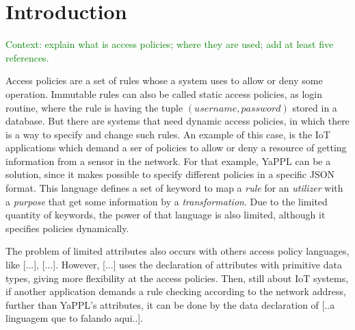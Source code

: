 \documentclass[sigplan,screen,anonymous,review]{acmart}\settopmatter{printfolios=true,printccs=false,printacmref=false}
\newcommand{\fer}[1]{\textcolor{green}{#1}}
\begin{document}


\maketitle


\section{Introduction}
\label{sec:intro}

\fer{Context: explain what is access policies; where they are used; add at least five references.}

Access policies are a set of rules whose a system uses to allow or deny some
operation.
Immutable rules can also be called static access policies, as login routine,
where the rule is having the tuple $(username, password)$ stored in a database.
But there are systems that need dynamic access policies, in which there is a
way to specify and change such rules.
An example of this case, is the IoT applications which demand a ser of policies
to allow or deny a resource of getting information from a sensor in the network.
For that example, YaPPL\cite{} can be a solution, since it makes possible to
specify different policies in a specific JSON format.
This language defines a set of keyword to map a \textit{rule} for an
\textit{utilizer} with a \textit{purpose} that get some information by a
\textit{transformation}.
Due to the limited quantity of keywords, the power of that language is also
limited, although it specifies policies dynamically.

The problem of limited attributes also occurs with others access policy
languages, like [...], [...].
However, [...] uses the declaration of attributes with primitive data types,
giving more flexibility at the access policies.
Then, still about IoT systems, if another application demands a rule checking
according to the network address, further than YaPPL's attributes, it can be
done by the data declaration of [..a linguagem que to falando aqui..].
\end{document}
